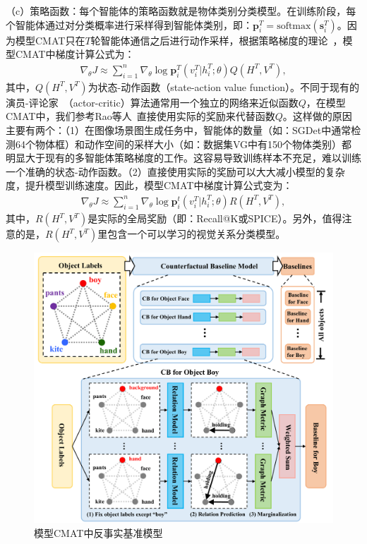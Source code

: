 （c）策略函数：每个智能体的策略函数就是物体类别分类模型。在训练阶段，每个智能体通过对分类概率进行采样得到智能体类别，即：$\bm{p}^T_i = \text{softmax}(\bm{s}^T_i)$。因为模型CMAT只在$T$轮智能体通信之后进行动作采样，根据策略梯度的理论~\cite{sutton2000policy}，模型CMAT中梯度计算公式为：
\begin{align}
\nabla_{\theta} J \approx \sum^n_{i=1} \nabla_{\theta} \log \bm{p}^T_i (v^T_i|h^T_i; \theta)Q(H^T, V^T),
\end{align}
其中，$Q(H^T, V^T)$为状态-动作函数（state-action value function）。不同于现有的演员-评论家~\cite{bahdanau2017actor,lowe2017multi,konda2000actor}（actor-critic）算法通常用一个独立的网络来近似函数$Q$，在模型CMAT中，我们参考Rao等人~\cite{rao2018learning}直接使用实际的奖励来代替函数$Q$。这样做的原因主要有两个：（1）在图像场景图生成任务中，智能体的数量（如：SGDet中通常检测64个物体框）和动作空间的采样大小（如：数据集VG中有150个物体类别）都明显大于现有的多智能体策略梯度的工作。这容易导致训练样本不充足，难以训练一个准确的状态-动作函数。（2）直接使用实际的奖励可以大大减小模型的复杂度，提升模型训练速度。因此，模型CMAT中梯度计算公式变为：
\begin{align} \label{ch4:eq:eq_7}
\nabla_{\theta} J \approx \sum^n_{i=1} \nabla_{\theta} \log \bm{p}^t_i (v^T_i|h^T_i; \theta) R(H^T, V^T),
\end{align}
其中，$R(H^T, V^T)$是实际的全局奖励（即：Recall@K或SPICE）。另外，值得注意的是，$R(H^T, V^T)$里包含一个可以学习的视觉关系分类模型。

\begin{figure}[t]
    \centering
        \includegraphics[width=0.95\linewidth]{chapter4/res/baseline.pdf}
    \caption{模型CMAT中反事实基准模型}
    \label{ch4:fig:baseline}
\end{figure}


